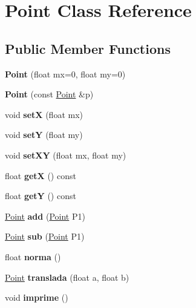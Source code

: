 \hypertarget{classPoint}{}\section{Point Class Reference}
\label{classPoint}
\subsection*{Public Member Functions}
\begin{DoxyCompactItemize}
\item 
\mbox{\label{classPoint_a30773ae254834ba9ce4661bf492cd07a}} 
{\bfseries Point} (float mx=0, float my=0)
\item 
\mbox{\label{classPoint_af0c0f20db1616447bc78184ed537ef6e}} 
{\bfseries Point} (const \hyperlink{classPoint}{Point} \&p)
\item 
\mbox{\label{classPoint_acee4acaa1d515e9973145f977e500fe6}} 
void {\bfseries setX} (float mx)
\item 
\mbox{\label{classPoint_a756b3f64d961a5059302f42e1fcf2332}} 
void {\bfseries setY} (float my)
\item 
\mbox{\label{classPoint_afe2b937778d9fe5c135ab61de91271e9}} 
void {\bfseries set\+XY} (float mx, float my)
\item 
\mbox{\label{classPoint_a29c44ec7c7279e02629645a06cdaf7d5}} 
float {\bfseries getX} () const
\item 
\mbox{\label{classPoint_a2371ffadbe245d12a8f556d0a976521b}} 
float {\bfseries getY} () const
\item 
\mbox{\label{classPoint_a039e6b445145494242cf2baa3895bcf7}} 
\hyperlink{classPoint}{Point} {\bfseries add} (\hyperlink{classPoint}{Point} P1)
\item 
\mbox{\label{classPoint_a01d301ef29a031f0ce7df37c2da12e49}} 
\hyperlink{classPoint}{Point} {\bfseries sub} (\hyperlink{classPoint}{Point} P1)
\item 
\mbox{\label{classPoint_abd2618d1f505d9392893273a66e7c9b2}} 
float {\bfseries norma} ()
\item 
\mbox{\label{classPoint_a8fc932c5dcb7ef85208b01f7efa83163}} 
\hyperlink{classPoint}{Point} {\bfseries translada} (float a, float b)
\item 
\mbox{\label{classPoint_a1fb5c2501c27ab2cbc99d06c2a26a741}} 
void {\bfseries imprime} ()
\end{DoxyCompactItemize}
